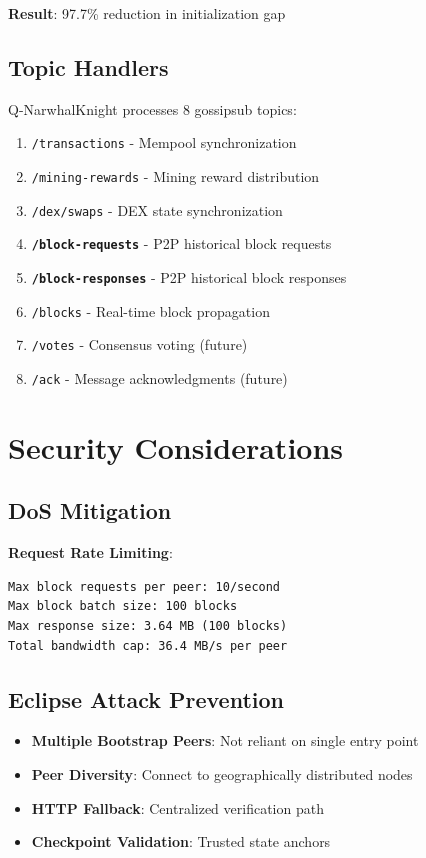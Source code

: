 \documentclass[11pt,a4paper]{article}
\begin{document}
\textbf{Result}: 97.7\% reduction in initialization gap

\subsection{Topic Handlers}

Q-NarwhalKnight processes 8 gossipsub topics:

\begin{enumerate}
\item \texttt{/transactions} - Mempool synchronization
\item \texttt{/mining-rewards} - Mining reward distribution
\item \texttt{/dex/swaps} - DEX state synchronization
\item \textbf{\texttt{/block-requests}} - P2P historical block requests
\item \textbf{\texttt{/block-responses}} - P2P historical block responses
\item \texttt{/blocks} - Real-time block propagation
\item \texttt{/votes} - Consensus voting (future)
\item \texttt{/ack} - Message acknowledgments (future)
\end{enumerate}

\section{Security Considerations}

\subsection{DoS Mitigation}

\textbf{Request Rate Limiting}:

\begin{verbatim}
Max block requests per peer: 10/second
Max block batch size: 100 blocks
Max response size: 3.64 MB (100 blocks)
Total bandwidth cap: 36.4 MB/s per peer
\end{verbatim}

\subsection{Eclipse Attack Prevention}

\begin{itemize}
\item \textbf{Multiple Bootstrap Peers}: Not reliant on single entry point
\item \textbf{Peer Diversity}: Connect to geographically distributed nodes
\item \textbf{HTTP Fallback}: Centralized verification path
\item \textbf{Checkpoint Validation}: Trusted state anchors
\end{itemize}
\end{document}
